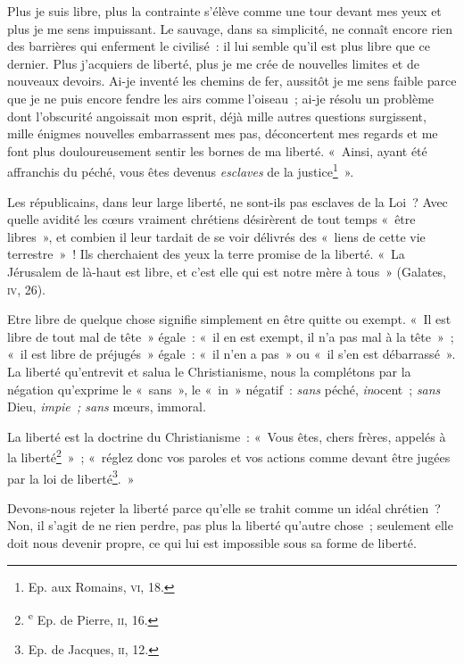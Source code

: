\documentclass[french,twoside]{book} %
\begin{document}
Plus je suis libre, plus la contrainte s’élève comme une tour devant mes yeux et plus je me sens impuissant. Le sauvage, dans sa simplicité, ne connaît encore rien des barrières qui enferment le civilisé : il lui semble qu’il est plus libre que ce dernier. Plus j’acquiers de liberté, plus je me crée de nouvelles limites et de nouveaux devoirs. Ai-je inventé les chemins de fer, aussitôt je me sens faible parce que je ne puis encore fendre les airs comme l’oiseau ; ai-je résolu un problème dont l’obscurité angoissait mon esprit,  déjà mille autres questions surgissent, mille énigmes nouvelles embarrassent mes pas, déconcertent mes regards et me font plus douloureusement sentir les bornes de ma liberté. « Ainsi, ayant été affranchis du péché, vous êtes devenus \emph{esclaves} de la justice\footnote{ \noindent Ep. aux Romains, {\scshape vi}, 18.
 } ».\par
Les républicains, dans leur large liberté, ne sont-ils pas esclaves de la Loi ? Avec quelle avidité les cœurs vraiment chrétiens désirèrent de tout temps « être libres », et combien il leur tardait de se voir délivrés des « liens de cette vie terrestre » ! Ils cherchaient des yeux la terre promise de la liberté. « La Jérusalem de là-haut est libre, et c’est elle qui est notre mère à tous » (Galates, {\scshape iv}, 26).\par
Etre libre de quelque chose signifie simplement en être quitte ou exempt. « Il est libre de tout mal de tête » égale : « il en est exempt, il n’a pas mal à la tête » ; « il est libre de préjugés » égale : « il n’en a pas » ou « il s’en est débarrassé ». La liberté qu’entrevit et salua le Christianisme, nous la complétons par la négation qu’exprime le « sans », le « in » négatif : \emph{sans} péché, \emph{in}ocent ; \emph{sans} Dieu, \emph{impie ; sans }mœurs, immoral.\par
La liberté est la doctrine du Christianisme : « Vous êtes, chers frères, appelés à la liberté\footnote{ \textsuperscript{e} Ep. de Pierre, {\scshape ii}, 16.
 } » ; « réglez donc vos paroles et vos actions comme devant être jugées par la loi de liberté\footnote{ \noindent Ep. de Jacques, {\scshape ii}, 12.
 }. »\par
Devons-nous rejeter la liberté parce qu’elle se trahit comme un idéal chrétien ? Non, il s’agit de ne rien perdre, pas plus la liberté qu’autre chose ; seulement elle doit nous devenir propre, ce qui lui est impossible sous sa forme de liberté.\par
\end{document}
